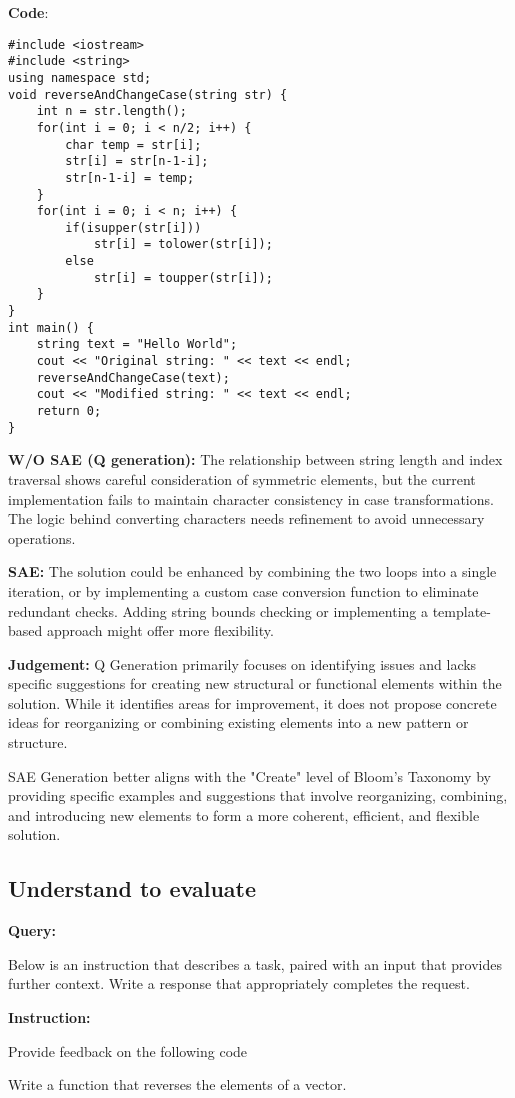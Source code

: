 \textbf{Code}:
\begin{lstlisting}
#include <iostream>
#include <string>
using namespace std;
void reverseAndChangeCase(string str) {
    int n = str.length();
    for(int i = 0; i < n/2; i++) {
        char temp = str[i];
        str[i] = str[n-1-i];
        str[n-1-i] = temp;
    }
    for(int i = 0; i < n; i++) {
        if(isupper(str[i]))
            str[i] = tolower(str[i]);
        else
            str[i] = toupper(str[i]);
    }
}
int main() {
    string text = "Hello World";
    cout << "Original string: " << text << endl;
    reverseAndChangeCase(text);
    cout << "Modified string: " << text << endl;
    return 0;
}
\end{lstlisting}
\textbf{W/O SAE (Q generation):} The relationship between string length and index traversal shows careful consideration of symmetric elements, but the current implementation fails to maintain character consistency in case transformations. The logic behind converting characters needs refinement to avoid unnecessary operations.\par

\textbf{SAE:} The solution could be enhanced by combining the two loops into a single iteration, or by implementing a custom case conversion function to eliminate redundant checks. Adding string bounds checking or implementing a template-based approach might offer more flexibility. \par
\textbf{Judgement:} Q Generation primarily focuses on identifying issues and lacks specific suggestions for creating new structural or functional elements within the solution. While it identifies areas for improvement, it does not propose concrete ideas for reorganizing or combining existing elements into a new pattern or structure.

SAE Generation  better aligns with the "Create" level of Bloom's Taxonomy by providing specific examples and suggestions that involve reorganizing, combining, and introducing new elements to form a more coherent, efficient, and flexible solution.


\medskip
\subsection*{Understand to evaluate}



\textbf{Query:}

Below is an instruction that describes a task, paired with an input that provides further context. Write a response that appropriately completes the request.\par
\textbf{Instruction:}\par
Provide feedback on the following code \par
Write a function that reverses the elements of a vector.\par

